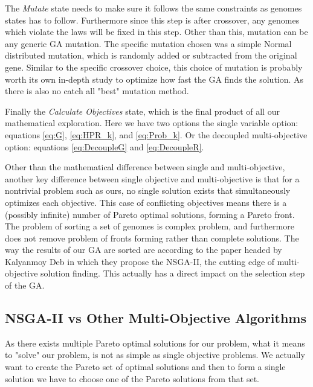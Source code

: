 \documentclass[11pt]{article}
\begin{document}
    The \textit{Mutate} state needs to make sure it follows the same constraints as
    genomes states has to follow. Furthermore since this step is after crossover,
    any genomes which violate the laws will be fixed in this step. Other than this,
    mutation can be any generic GA mutation. The specific mutation chosen was a
    simple Normal distributed mutation, which is randomly added or subtracted from
    the original gene. Similar to the specific crossover choice, this choice
    of mutation is probably worth its own in-depth study to optimize how fast
    the GA finds the solution. As there is also no catch all "best" mutation method.

    Finally the \textit{Calculate Objectives} state, which is the final product of all our
    mathematical exploration. Here we have two options the single variable option: equations
    \ref{eq:G}, \ref{eq:HPR_k}, and \ref{eq:Prob_k}. Or the decoupled multi-objective
    option: equations \ref{eq:DecoupleG} and \ref{eq:DecoupleR}. 

    Other than the mathematical difference between single and multi-objective,
    another key difference between single objective and multi-objective is that for a
    nontrivial problem such as ours, no single solution exists that simultaneously
    optimizes each objective. This case of conflicting objectives means there is
    a (possibly infinite) number of Pareto optimal solutions, forming a Pareto front.
    The problem of sorting a set of genomes is complex problem, and furthermore
    does not remove problem of fronts forming rather than complete solutions.
    The way the results of our GA are sorted are according to the paper headed by
    Kalyanmoy Deb \cite{DebPratapAgarwalMeyarivan} in which they propose the
    NSGA-II, the cutting edge of multi-objective solution finding. This actually
    has a direct impact on the selection step of the GA.

\subsection{NSGA-II vs Other Multi-Objective Algorithms}

    As there exists multiple Pareto optimal solutions for our problem, what it means to "solve"
    our problem, is not as simple as single objective problems. We actually want to create the
    Pareto set of optimal solutions and then to form a single solution we have to choose one of
    the Pareto solutions from that set.
\end{document}
